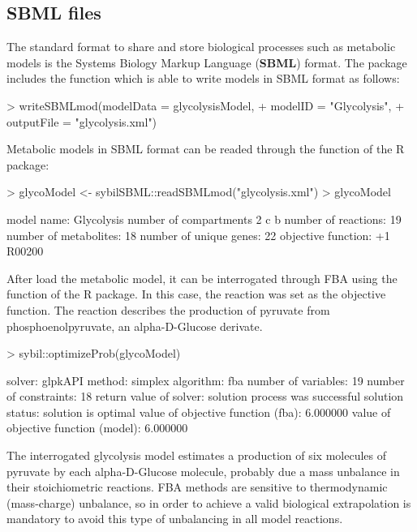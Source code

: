 \subsection{SBML files}
The standard format to share and store biological processes such as metabolic models is the Systems Biology Markup Language (\textbf{SBML}) format. The  package includes the  function which is able to write models in SBML format as follows:
\begin{Schunk}
\begin{Sinput}
> writeSBMLmod(modelData = glycolysisModel,
+              modelID = "Glycolysis",
+              outputFile = "glycolysis.xml")
\end{Sinput}
\end{Schunk}
Metabolic models in SBML format can be readed through the  function of the  R package:
\begin{Schunk}
\begin{Sinput}
> glycoModel <- sybilSBML::readSBMLmod("glycolysis.xml")
> glycoModel
\end{Sinput}
\begin{Soutput}
model name:             Glycolysis 
number of compartments  2 
                        c 
                        b 
number of reactions:    19 
number of metabolites:  18 
number of unique genes: 22 
objective function:     +1 R00200 
\end{Soutput}
\end{Schunk}
After load the metabolic model, it can be interrogated through FBA using the  function of the  R package. In this case, the reaction  was set as the objective function. The  reaction describes the production of pyruvate from phosphoenolpyruvate, an alpha-D-Glucose derivate.

\begin{Schunk}
\begin{Sinput}
> sybil::optimizeProb(glycoModel)
\end{Sinput}
\begin{Soutput}
solver:                                   glpkAPI
method:                                   simplex
algorithm:                                fba
number of variables:                      19
number of constraints:                    18
return value of solver:                   solution process was successful
solution status:                          solution is optimal
value of objective function (fba):        6.000000
value of objective function (model):      6.000000
\end{Soutput}
\end{Schunk}
The interrogated glycolysis model estimates a production of six molecules of pyruvate by each alpha-D-Glucose molecule, probably due a mass unbalance in their stoichiometric reactions. FBA methods are sensitive to thermodynamic (mass-charge) unbalance, so in order to achieve a valid biological extrapolation is mandatory to avoid this type of unbalancing in all model reactions.
